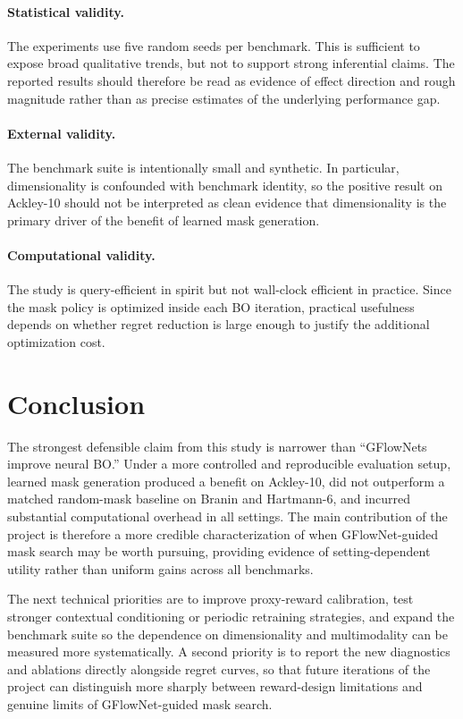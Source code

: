 \documentclass{article}
\begin{document}
\paragraph{Statistical validity.} The experiments use five random seeds per benchmark. This is sufficient to expose broad qualitative trends, but not to support strong inferential claims. The reported results should therefore be read as evidence of effect direction and rough magnitude rather than as precise estimates of the underlying performance gap.

\paragraph{External validity.} The benchmark suite is intentionally small and synthetic. In particular, dimensionality is confounded with benchmark identity, so the positive result on Ackley-10 should not be interpreted as clean evidence that dimensionality is the primary driver of the benefit of learned mask generation.

\paragraph{Computational validity.} The study is query-efficient in spirit but not wall-clock efficient in practice. Since the mask policy is optimized inside each BO iteration, practical usefulness depends on whether regret reduction is large enough to justify the additional optimization cost.


\section{Conclusion}

The strongest defensible claim from this study is narrower than ``GFlowNets improve neural BO.'' Under a more controlled and reproducible evaluation setup, learned mask generation produced a benefit on Ackley-10, did not outperform a matched random-mask baseline on Branin and Hartmann-6, and incurred substantial computational overhead in all settings. The main contribution of the project is therefore a more credible characterization of when GFlowNet-guided mask search may be worth pursuing, providing evidence of setting-dependent utility rather than uniform gains across all benchmarks.

The next technical priorities are to improve proxy-reward calibration, test stronger contextual conditioning or periodic retraining strategies, and expand the benchmark suite so the dependence on dimensionality and multimodality can be measured more systematically. A second priority is to report the new diagnostics and ablations directly alongside regret curves, so that future iterations of the project can distinguish more sharply between reward-design limitations and genuine limits of GFlowNet-guided mask search.
\end{document}
